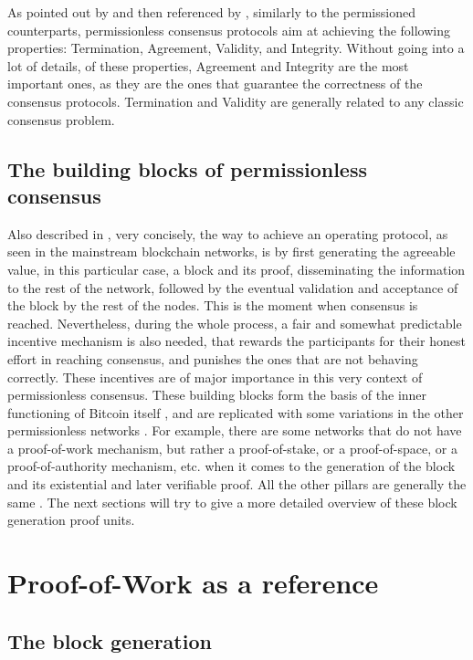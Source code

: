 \documentclass[journal]{IEEEtran}
\begin{document}
As pointed out by \cite{xiao2019distributed} and then referenced by \cite{survey-dist-consensus}, 
similarly to the permissioned counterparts, permissionless consensus protocols 
aim at achieving the following properties: Termination, Agreement, Validity, 
and Integrity. Without going into a lot of details, of these properties, 
Agreement and Integrity are the most important ones, as they are the ones that
guarantee the correctness of the consensus protocols. Termination and Validity
are generally related to any classic consensus problem.

\subsection{The building blocks of permissionless consensus}

Also described in \cite{survey-dist-consensus}, very concisely, the 
way to achieve an operating protocol, as seen in the mainstream blockchain
networks, is by first generating the agreeable value, 
in this particular case, a block and its proof, disseminating the information 
to the rest of the network, followed by the eventual validation and 
acceptance of the block by the rest of the nodes. This is the moment when consensus is reached.
Nevertheless, during the whole process, a fair and somewhat predictable incentive mechanism 
is also needed, that rewards the participants for their honest effort in reaching consensus, and
punishes the ones that are not behaving correctly. These incentives are of major importance
in this very context of permissionless consensus. 
These building blocks form the basis of the inner functioning of Bitcoin itself \cite{nakamoto2008bitcoin},
and are replicated with some variations in the other permissionless networks \cite{buterin2014next}.
For example, there are some networks that do not have a proof-of-work mechanism,
but rather a proof-of-stake, or a proof-of-space, or a proof-of-authority mechanism, etc.
when it comes to the generation of the block and its existential and later verifiable proof.
All the other pillars are generally the same \cite{survey-dist-consensus}.
The next sections will try to give a more detailed overview of these 
block generation proof units.

\section{Proof-of-Work as a reference}

\subsection{The block generation}
\end{document}
